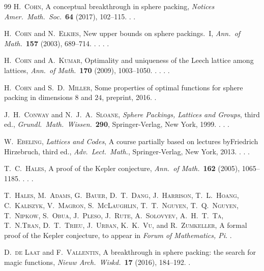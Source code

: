 \documentclass{aomart}
\theoremstyle{plain}
\numberwithin{theorem}{section}
\numberwithin{equation}{section}
\begin{document}
\begin{thebibliography}{99}
 \textsc{H.~Cohn}, A conceptual breakthrough in sphere
    packing,
    \emph{Notices Amer.\ Math.\ Soc.}\ \textbf{64} (2017), 102--115.
    .
    .

 \textsc{H.~Cohn} and \textsc{N.~Elkies}, New upper bounds
    on sphere packings.\ I, \emph{Ann.\ of Math.}\ \textbf{157} (2003), 689--714.
    .
    .
    .
    .

 \textsc{H.~Cohn} and \textsc{A.~Kumar}, Optimality and
    uniqueness of the Leech lattice among lattices,
    \emph{Ann.\ of Math.}\ \textbf{170} (2009), 1003--1050.
    . . . .

 \textsc{H.~Cohn} and \textsc{S.~D.~Miller}, Some
    properties of optimal functions for sphere packing in dimensions $8$
    and $24$, preprint, 2016. .

 \textsc{J.~H.~Conway} and \textsc{N.~J.~A.~Sloane},
    \emph{Sphere Packings, Lattices and Groups}, third ed.,
    \emph{Grundl.\ Math.\ Wissen.}\ \textbf{290},
    Springer-Verlag, New York, 1999. . .
    .

 \textsc{W.~Ebeling}, \emph{Lattices and Codes}, A course
    partially based on lectures by\break Friedrich Hirzebruch, third ed.,
    \emph{Adv.\ Lect.\ Math.}, Springer-Verlag, New York, 2013.
    . . .

 \textsc{T.~C.~Hales}, A proof of the Kepler
    conjecture, \emph{Ann.\ of Math.}\ \textbf{162} (2005), 1065--1185.
    . .
    .

 \textsc{T.~Hales, M.~Adams, G.~Bauer, D.~T.~Dang, J.~Harrison,
    T.~L.~Hoang, C.~Kaliszyk, V.~Magron, S.~McLaughlin, T.~T.~Nguyen,
    T.~Q.~Nguyen, T.~Nipkow, S.~Obua, J.~Pleso, J.~Rute,
    A.~Solovyev, A.~H.~T.~Ta, T.~N.\break Tran, D.~T.~Trieu, J.~Urban, K.~K.~Vu,} and
    \textsc{R.~Zumkeller}, A formal proof of the Kepler
    conjecture, to appear in \emph{Forum of Mathematics, Pi}.
    .

 \textsc{D.~de Laat} and \textsc{F.~Vallentin},
    A breakthrough in sphere packing: the search for magic
    functions, \emph{Nieuw Arch.\ Wiskd.}\ \textbf{17} (2016), 184--192.
    .


\end{thebibliography}
\end{document}
